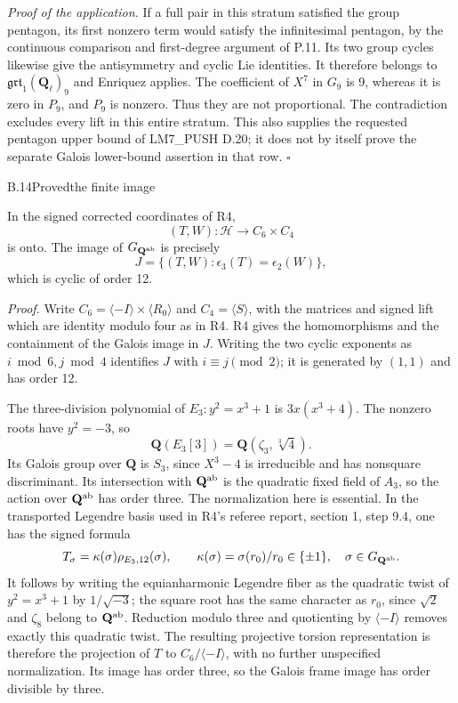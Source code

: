 \emph{Proof of the application.}
If a full pair in this stratum satisfied the group pentagon, its
first nonzero term would satisfy the infinitesimal pentagon, by
the continuous comparison and first-degree argument of P.11.
Its two group cycles likewise give the antisymmetry and cyclic
Lie identities. It therefore belongs to
$\mathfrak{grt}_1(\mathbf Q_\ell)_9$ and Enriquez applies.
The coefficient of $X^7$ in $G_9$ is 9, whereas it is zero in
$P_9$, and $P_9$ is nonzero. Thus they are not proportional.
The contradiction excludes every lift in this entire stratum.
This also supplies the requested pentagon upper bound of
LM7\_PUSH D.20; it does not by itself prove the separate
Galois lower-bound assertion in that row. \hfill$\square$

\begin{statement}{B.14}{Proved}{the finite image}
\end{statement}
In the signed corrected coordinates of R4,
\[
 (T,W):\mathcal H\longrightarrow C_6\times C_4
\]
is onto. The image of $G_{\mathbf Q^{\rm ab}}$ is precisely
\[
 J=\{(T,W):\epsilon_3(T)=\epsilon_2(W)\},
\]
which is cyclic of order 12.

\emph{Proof.}
Write $C_6=\langle -I\rangle\times\langle R_0\rangle$ and
$C_4=\langle S\rangle$, with the matrices and signed lift
which are identity modulo four as in R4. R4 gives the
homomorphisms and the containment of the Galois image in $J$.
Writing the two cyclic exponents as $i\bmod6,j\bmod4$ identifies
$J$ with $i\equiv j\pmod2$; it is generated by $(1,1)$ and has
order 12.

The three-division polynomial of $E_3:y^2=x^3+1$ is
$3x(x^3+4)$. The nonzero roots have $y^2=-3$, so
\[
 \mathbf Q(E_3[3])=\mathbf Q(\zeta_3,\sqrt[3]4).
\]
Its Galois group over $\mathbf Q$ is $S_3$, since $X^3-4$ is
irreducible and has nonsquare discriminant. Its intersection
with $\mathbf Q^{\rm ab}$ is the quadratic fixed field of
$A_3$, so the action over $\mathbf Q^{\rm ab}$ has order three.
The normalization here is essential. In the transported Legendre
basis used in R4's referee report, section 1, step 9.4, one has the
signed formula
\[
 T_\sigma=\kappa(\sigma)\rho_{E_3,12}(\sigma),\qquad
 \kappa(\sigma)=\sigma(r_0)/r_0\in\{\pm1\},
 \quad \sigma\in G_{\mathbf Q^{\rm ab}}.
\]
It follows by writing the equianharmonic Legendre fiber as the
quadratic twist of $y^2=x^3+1$ by $1/\sqrt{-3}$; the square root
has the same character as $r_0$, since $\sqrt2$ and $\zeta_8$
belong to $\mathbf Q^{\rm ab}$. Reduction modulo three and
quotienting by $\langle-I\rangle$ removes exactly this quadratic
twist. The resulting projective torsion representation is therefore
the projection of $T$ to $C_6/\langle-I\rangle$, with no further
unspecified normalization. Its image has order three, so the
Galois frame image has order divisible by three.

